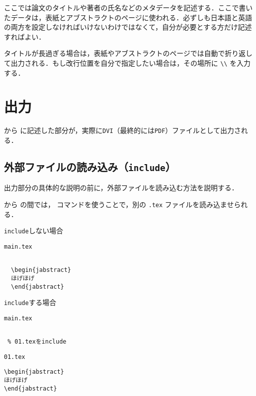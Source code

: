 ここでは論文のタイトルや著者の氏名などのメタデータを記述する．ここで書いたデータは，表紙とアブストラクトのページに使われる．必ずしも日本語と英語の両方を設定しなければいけないわけではなくて，自分が必要とする方だけ記述すればよい．

タイトルが長過ぎる場合は，表紙やアブストラクトのページでは自動で折り返して出力される．もし改行位置を自分で指定したい場合は，その場所に \verb|\\| を入力する．


\section{出力}

\verb|| から \verb|| に記述した部分が，実際に{\tt DVI}（最終的には{\tt PDF}）ファイルとして出力される．

\subsection{外部ファイルの読み込み（{\tt include}）}

出力部分の具体的な説明の前に，外部ファイルを読み込む方法を説明する．

\verb|| から \verb|| の間では，\verb|| コマンドを使うことで，別の {\tt *.tex} ファイルを読み込ませられる． 

\begin{itembox}[l]{{\tt include}しない場合}
\begin{itembox}[l]{{\tt main.tex}}
\begin{verbatim}

  \begin{jabstract}
  ほげほげ
  \end{jabstract}

\end{verbatim}
\end{itembox}
\end{itembox}

\begin{itembox}[l]{{\tt include}する場合}
\begin{minipage}{0.5\hsize}
\begin{itembox}[l]{{\tt main.tex}}
\begin{verbatim}

 % 01.texをinclude

\end{verbatim}
\end{itembox}
\end{minipage}
\begin{minipage}{0.5\hsize}
\begin{itembox}[l]{{\tt 01.tex}}
\begin{verbatim}
\begin{jabstract}
ほげほげ
\end{jabstract}
\end{verbatim}
\end{itembox}
\end{minipage}
\end{itembox}

